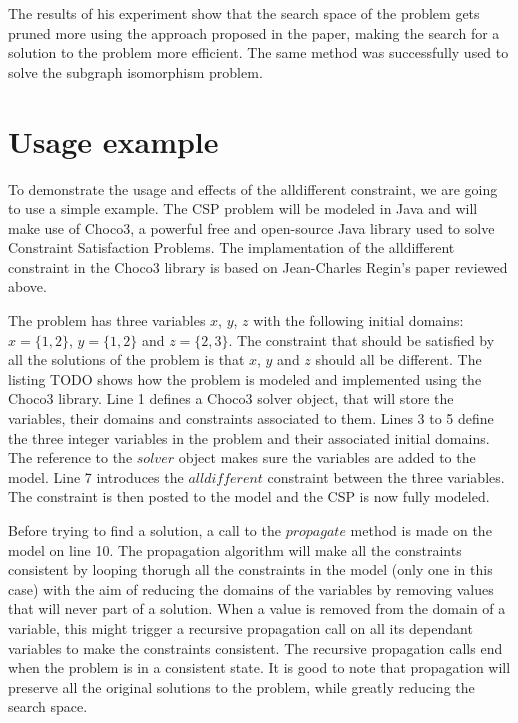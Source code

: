 \documentclass{l4proj}
\begin{document}
\noindent The results of his experiment show that the search space of the problem gets pruned more using the approach proposed in the paper, making the search for a solution to the problem more efficient. The same method was successfully used to solve the subgraph isomorphism problem. \cite{regin1994filtering}

\section{Usage example}
\noindent To demonstrate the usage and effects of the alldifferent constraint, we are going to use a simple example. The CSP problem will be modeled in Java and will make use of Choco3, a powerful free and open-source Java library used to solve Constraint Satisfaction Problems. The implamentation of the alldifferent constraint in the Choco3 library is based on Jean-Charles Regin's paper\cite{regin1994filtering} reviewed above.

\noindent The problem has three variables $x$, $y$, $z$ with the following initial domains: $x = \{1, 2\}$, $y = \{1, 2\}$ and $z = \{2, 3\}$. The constraint that should be satisfied by all the solutions of the problem is that $x$, $y$ and $z$ should all be different. The listing TODO shows how the problem is modeled and implemented using the Choco3 library. Line 1 defines a Choco3 solver object, that will store the variables, their domains and constraints associated to them. Lines 3 to 5 define the three integer variables in the problem and their associated initial domains. The reference to the $solver$ object makes sure the variables are added to the model. Line 7 introduces the $alldifferent$ constraint between the three variables. The constraint is then posted to the model and the CSP is now fully modeled.

\noindent Before trying to find a solution, a call to the $propagate$ method is made on the model on line 10. The propagation algorithm will make all the constraints consistent by looping thorugh all the constraints in the model (only one in this case) with the aim of reducing the domains of the variables by removing values that will never part of a solution. When a value is removed from the domain of a variable, this might trigger a recursive propagation call on all its dependant variables to make the constraints consistent. The recursive propagation calls end when the problem is in a consistent state. It is good to note that propagation will preserve all the original solutions to the problem, while greatly reducing the search space.
\end{document}

